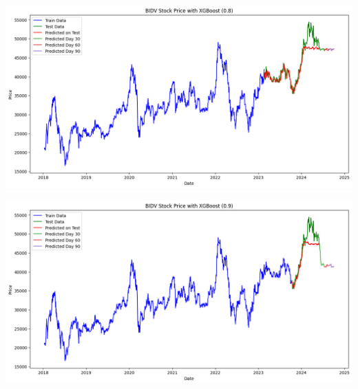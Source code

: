 \documentclass[conference]{IEEEtran}
\begin{document}
\begin{minipage}{0.21\textwidth}
    \centering
    \includegraphics[width=\linewidth]{images/XGBoost/XGBoost_BIDV_82.png}
    \label{fig:image1}
\end{minipage}
\hfill
\begin{minipage}{0.21\textwidth}
    \centering
    \includegraphics[width=\linewidth]{images/XGBoost/XGBoost_BIDV_91.png}
    \label{fig:image2}
\end{minipage}
\end{document}

